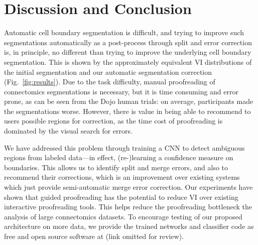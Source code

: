 \section{Discussion and Conclusion}

Automatic cell boundary segmentation is difficult, and trying to improve such segmentations automatically as a post-process through split and error correction is, in principle, no different than trying to improve the underlying cell boundary segmentation. This is shown by the approximately equivalent VI distributions of the initial segmentation and our automatic segmentation correction (Fig.~\ref{fig:results}). Due to the task difficulty, manual proofreading of connectomics segmentations is necessary, but it is time consuming and error prone, as can be seen from the Dojo human trials: on average, participants made the segmentations worse. However, there is value in being able to recommend to users possible regions for correction, as the time cost of proofreading is dominated by the visual search for errors.

We have addressed this problem through training a CNN to detect ambiguous regions from labeled data---in effect, (re-)learning a confidence measure on boundaries. This allows us to identify split and merge errors, and also to recommend their corrections, which is an improvement over existing systems which just provide semi-automatic merge error correction. Our experiments have shown that guided proofreading has the potential to reduce VI over existing interactive proofreading tools. This helps reduce the proofreading bottleneck  the analysis of large connectomics datasets. To encourage testing of our proposed architecture on more data, we provide the trained networks and classifier code as free and open source software at (link omitted for review).




